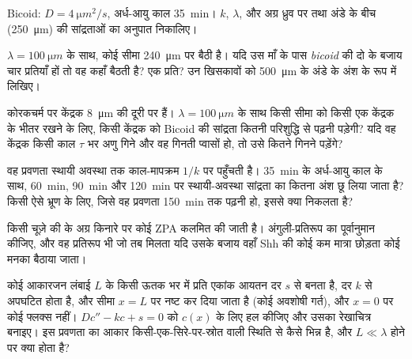 \begin{exercise}[$\star\star$]\label{exo:b3:developmental-genetics:5}
Bicoid: $D = \qty{4}{\micro m^2/s}$, अर्ध-आयु काल \qty{35}{min}।
$k$, $\lambda$, और अग्र ध्रुव पर तथा अंडे के बीच
(\qty{250}{\micro m}) की सांद्रताओं का अनुपात निकालिए।
\end{exercise}

\begin{exercise}[$\star\star$]\label{exo:b3:developmental-genetics:6}
$\lambda = \qty{100}{\micro m}$ के साथ, कोई सीमा
\qty{240}{\micro m} पर बैठी है। यदि उस माँ के पास \emph{bicoid} की दो
के बजाय चार प्रतियाँ हों तो वह कहाँ बैठती है? एक प्रति? उन खिसकावों को
\qty{500}{\micro m} के अंडे के अंश के रूप में लिखिए।
\end{exercise}

\begin{exercise}[$\star\star$]\label{exo:b3:developmental-genetics:7}
कोरकचर्म पर केंद्रक \qty{8}{\micro m} की दूरी पर हैं।
$\lambda = \qty{100}{\micro m}$ के साथ किसी सीमा को किसी एक केंद्रक के
भीतर रखने के लिए, किसी केंद्रक को Bicoid की सांद्रता कितनी परिशुद्धि से
पढ़नी पड़ेगी? यदि वह केंद्रक किसी काल $\tau$ भर अणु गिने और वह गिनती
प्वासों हो, तो उसे कितने गिनने पड़ेंगे?
\end{exercise}

\begin{exercise}[$\star\star$]\label{exo:b3:developmental-genetics:8}
वह प्रवणता स्थायी अवस्था तक काल-मापक्रम $1/k$ पर पहुँचती है।
\qty{35}{min} के अर्ध-आयु काल के साथ, \qty{60}{min}, \qty{90}{min} और
\qty{120}{min} पर स्थायी-अवस्था सांद्रता का कितना अंश छू लिया जाता है?
किसी ऐसे भ्रूण के लिए, जिसे वह प्रवणता \qty{150}{min} तक पढ़नी हो, इससे
क्या निकलता है?
\end{exercise}

\begin{exercise}[$\star\star$]\label{exo:b3:developmental-genetics:9}
किसी चूज़े की  के अग्र किनारे पर कोई ZPA कलमित की जाती है।
अंगुली-प्रतिरूप का पूर्वानुमान कीजिए, और वह प्रतिरूप भी जो तब मिलता यदि
उसके बजाय वहाँ Shh की कोई कम मात्रा छोड़ता कोई मनका बैठाया जाता।
\end{exercise}

\begin{exercise}[$\star\star\star$]\label{exo:b3:developmental-genetics:10}
कोई आकारजन लंबाई $L$ के किसी ऊतक भर में प्रति एकांक आयतन दर $s$ से बनता
है, दर $k$ से अपघटित होता है, और सीमा $x =
L$ पर नष्ट कर दिया जाता है (कोई अवशोषी गर्त), और $x = 0$ पर कोई फ्लक्स
नहीं। $Dc'' - kc + s =
0$ को $c(x)$ के लिए हल कीजिए और उसका रेखाचित्र बनाइए। इस प्रवणता का आकार किसी-एक-सिरे-पर-स्रोत
वाली स्थिति से कैसे भिन्न है, और $L \ll \lambda$ होने पर क्या होता है?
\end{exercise}

